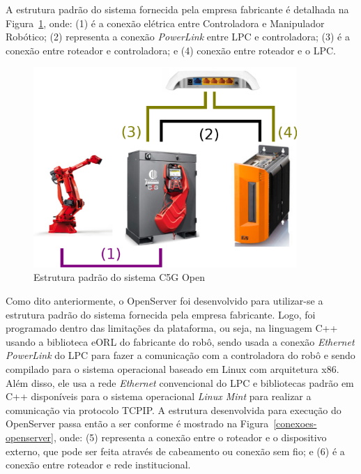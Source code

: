         A estrutura padrão do sistema fornecida pela empresa fabricante é detalhada na Figura~\ref{conexoes-padrao}, onde: (1) é a conexão elétrica entre Controladora e Manipulador Robótico; (2) representa a conexão \textit{PowerLink} entre \ac{LPC} e controladora; (3) é a conexão entre roteador e controladora; e (4) conexão entre roteador e o \ac{LPC}.
    
        \begin{figure}[ht]
            \centering
            \includegraphics[width=10cm]{imagens/Conexoes/conexoes-padrao.eps}
            \small 
            \centering 
            \caption{Estrutura padrão do sistema C5G Open}
            \label{conexoes-padrao}
        \end{figure}
          
        Como dito anteriormente, o OpenServer foi desenvolvido para utilizar-se a estrutura padrão do sistema fornecida pela empresa fabricante. Logo, foi programado dentro das limitações da plataforma, ou seja, na linguagem C++ usando a biblioteca \ac{eORL} do fabricante do robô, sendo usada a conexão \textit{Ethernet PowerLink} do LPC para fazer a comunicação com a controladora do robô e sendo compilado para o sistema operacional baseado em Linux com arquitetura x86. Além disso, ele usa a rede \textit{Ethernet} convencional do LPC e bibliotecas padrão em C++ disponíveis para o sistema operacional \textit{Linux Mint} para realizar a comunicação via protocolo \ac{TCPIP}. A estrutura desenvolvida para execução do OpenServer passa então a ser conforme é mostrado na Figura~\ref{conexoes-openserver}, onde: (5) representa a conexão entre o roteador e o dispositivo externo, que pode ser feita através de cabeamento ou conexão sem fio; e (6) é a conexão entre roteador e rede institucional.
        
